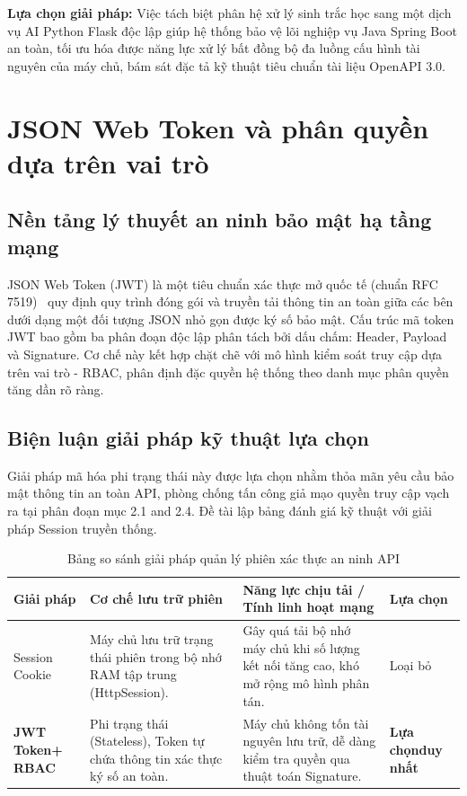 ﻿\documentclass[../DoAn.tex]{subfiles}
\begin{document}
\textbf{Lựa chọn giải pháp:} Việc tách biệt phân hệ xử lý sinh trắc học sang một dịch vụ AI Python Flask độc lập giúp hệ thống bảo vệ lõi nghiệp vụ Java Spring Boot an toàn, tối ưu hóa được năng lực xử lý bất đồng bộ đa luồng cấu hình tài nguyên của máy chủ, bám sát đặc tả kỹ thuật tiêu chuẩn tài liệu OpenAPI 3.0.

\clearpage

\section{JSON Web Token và phân quyền dựa trên vai trò}
\label{section:3.5}

\subsection{Nền tảng lý thuyết an ninh bảo mật hạ tầng mạng}

JSON Web Token (JWT) là một tiêu chuẩn xác thực mở quốc tế (chuẩn RFC 7519)~\cite{rfc7519} quy định quy trình đóng gói và truyền tải thông tin an toàn giữa các bên dưới dạng một đối tượng JSON nhỏ gọn được ký số bảo mật. Cấu trúc mã token JWT bao gồm ba phân đoạn độc lập phân tách bởi dấu chấm: Header, Payload và Signature. Cơ chế này kết hợp chặt chẽ với mô hình kiểm soát truy cập dựa trên vai trò - RBAC, phân định đặc quyền hệ thống theo danh mục phân quyền tăng dần rõ ràng.

\subsection{Biện luận giải pháp kỹ thuật lựa chọn}

Giải pháp mã hóa phi trạng thái này được lựa chọn nhằm thỏa mãn yêu cầu bảo mật thông tin an toàn API, phòng chống tấn công giả mạo quyền truy cập vạch ra tại phân đoạn mục 2.1 and 2.4. Đề tài lập bảng đánh giá kỹ thuật với giải pháp Session truyền thống.

\begin{table}[ht!]
\centering
\small
\renewcommand{\arraystretch}{1.3}
\caption{Bảng so sánh giải pháp quản lý phiên xác thực an ninh API}
\label{tab:security_comparison}
\begin{tabular}{|>{\raggedright\arraybackslash}p{2.3cm}|>{\raggedright\arraybackslash}p{4.5cm}|>{\raggedright\arraybackslash}p{5.5cm}|>{\centering\arraybackslash}p{1.7cm}|}
\hline
\textbf{Giải pháp} & \textbf{Cơ chế lưu trữ phiên} & \textbf{Năng lực chịu tải / Tính linh hoạt mạng} & \textbf{Lựa chọn} \\ \hline
Session Cookie & Máy chủ lưu trữ trạng thái phiên trong bộ nhớ RAM tập trung (HttpSession). & Gây quá tải bộ nhớ máy chủ khi số lượng kết nối tăng cao, khó mở rộng mô hình phân tán. & Loại bỏ \\ \hline
\textbf{JWT Token\newline + RBAC} & Phi trạng thái (Stateless), Token tự chứa thông tin xác thực ký số an toàn. & Máy chủ không tốn tài nguyên lưu trữ, dễ dàng kiểm tra quyền qua thuật toán Signature. & \textbf{Lựa chọn\newline duy nhất} \\ \hline
\end{tabular}
\end{table}
\end{document}
